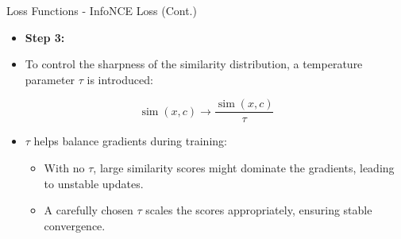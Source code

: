 \documentclass[serif, aspectratio=169]{beamer}
\begin{document}
\begin{frame}{Loss Functions - InfoNCE Loss (Cont.)}
    \begin{itemize}
        \item \textbf{Step 3:}
        \item To control the sharpness of the similarity distribution, a temperature parameter $\tau$ is introduced:
    \end{itemize}

    \begin{equation}
        \operatorname{sim}\left(x, c \right) \xrightarrow{}
        \frac{\operatorname{sim}\left(x, c \right)}{\tau}
    \end{equation}

    \begin{itemize}
        \item $\tau$ helps balance gradients during training:

        \begin{itemize}
            \item With no $\tau$, large similarity scores might dominate the gradients, leading to unstable updates.
            \item A carefully chosen $\tau$ scales the scores appropriately, ensuring stable convergence.
        \end{itemize}
    \end{itemize}
\end{frame}
\end{document}
